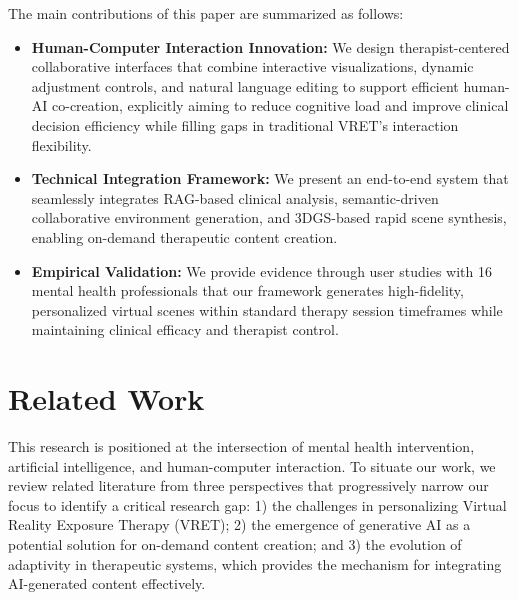 \documentclass[]{interact}
\begin{document}
The main contributions of this paper are summarized as follows:

\begin{itemize}
    \item \textbf{Human-Computer Interaction Innovation:} We design therapist-centered collaborative interfaces that combine interactive visualizations, dynamic adjustment controls, and natural language editing to support efficient human-AI co-creation, explicitly aiming to reduce cognitive load and improve clinical decision efficiency while filling gaps in traditional VRET's interaction flexibility.
    \item \textbf{Technical Integration Framework:} We present an end-to-end system that seamlessly integrates RAG-based clinical analysis, semantic-driven collaborative environment generation, and 3DGS-based rapid scene synthesis, enabling on-demand therapeutic content creation.
    \item \textbf{Empirical Validation:} We provide evidence through user studies with 16 mental health professionals that our framework generates high-fidelity, personalized virtual scenes within standard therapy session timeframes while maintaining clinical efficacy and therapist control.
\end{itemize}

\section{Related Work}

This research is positioned at the intersection of mental health intervention, artificial intelligence, and human-computer interaction. To situate our work, we review related literature from three perspectives that progressively narrow our focus to identify a critical research gap: 1) the challenges in personalizing Virtual Reality Exposure Therapy (VRET); 2) the emergence of generative AI as a potential solution for on-demand content creation; and 3) the evolution of adaptivity in therapeutic systems, which provides the mechanism for integrating AI-generated content effectively.
\end{document}
